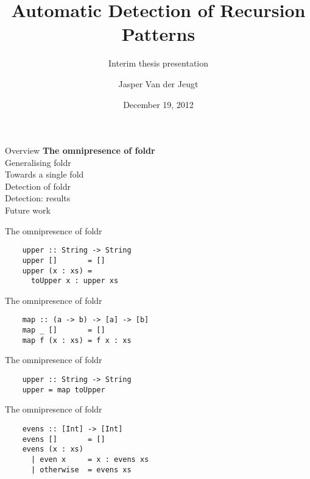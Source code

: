 \documentclass[20pt]{beamer}
\begin{document}
\title{Automatic Detection of Recursion Patterns}
\subtitle{Interim thesis presentation}
\author{Jasper Van der Jeugt}
\date{December 19, 2012}

\begin{frame}[plain]
    \titlepage
\end{frame}


\begin{frame}{Overview}
    \textbf{The omnipresence of foldr} \\
    Generalising foldr \\
    Towards a single fold \\
    Detection of foldr \\
    Detection: results \\
    Future work \\
\end{frame}

\begin{frame}[fragile]{The omnipresence of foldr}
    \begin{lstlisting}
    upper :: String -> String
    upper []       = []
    upper (x : xs) =
      toUpper x : upper xs
    \end{lstlisting}
\end{frame}

\begin{frame}[fragile]{The omnipresence of foldr}
    \begin{lstlisting}
    map :: (a -> b) -> [a] -> [b]
    map _ []       = []
    map f (x : xs) = f x : xs
    \end{lstlisting}
\end{frame}

\begin{frame}[fragile]{The omnipresence of foldr}
    \begin{lstlisting}
    upper :: String -> String
    upper = map toUpper
    \end{lstlisting}
\end{frame}

\begin{frame}[fragile]{The omnipresence of foldr}
    \begin{lstlisting}
    evens :: [Int] -> [Int]
    evens []       = []
    evens (x : xs)
      | even x     = x : evens xs
      | otherwise  = evens xs
    \end{lstlisting}
\end{frame}
\end{document}

